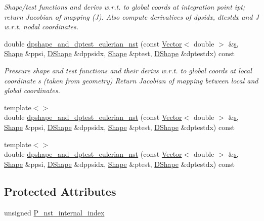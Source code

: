 \begin{DoxyCompactItemize}
\begin{DoxyCompactList}\small\item\em Shape/test functions and derivs w.\+r.\+t. to global coords at integration point ipt; return Jacobian of mapping (J). Also compute derivatives of dpsidx, dtestdx and J w.\+r.\+t. nodal coordinates. \end{DoxyCompactList}\item 
double \hyperlink{classoomph_1_1GeneralisedNewtonianTCrouzeixRaviartElement_a78649bc77d84259e16e565ddd31ff978}{dpshape\+\_\+and\+\_\+dptest\+\_\+eulerian\+\_\+nst} (const \hyperlink{classoomph_1_1Vector}{Vector}$<$ double $>$ \&\hyperlink{cfortran_8h_ab7123126e4885ef647dd9c6e3807a21c}{s}, \hyperlink{classoomph_1_1Shape}{Shape} \&ppsi, \hyperlink{classoomph_1_1DShape}{D\+Shape} \&dppsidx, \hyperlink{classoomph_1_1Shape}{Shape} \&ptest, \hyperlink{classoomph_1_1DShape}{D\+Shape} \&dptestdx) const
\begin{DoxyCompactList}\small\item\em Pressure shape and test functions and their derivs w.\+r.\+t. to global coords at local coordinate s (taken from geometry) Return Jacobian of mapping between local and global coordinates. \end{DoxyCompactList}\item 
{\footnotesize template$<$$>$ }\\double \hyperlink{classoomph_1_1GeneralisedNewtonianTCrouzeixRaviartElement_a8e7f3bf308bd4837cb0326706211de65}{dpshape\+\_\+and\+\_\+dptest\+\_\+eulerian\+\_\+nst} (const \hyperlink{classoomph_1_1Vector}{Vector}$<$ double $>$ \&\hyperlink{cfortran_8h_ab7123126e4885ef647dd9c6e3807a21c}{s}, \hyperlink{classoomph_1_1Shape}{Shape} \&ppsi, \hyperlink{classoomph_1_1DShape}{D\+Shape} \&dppsidx, \hyperlink{classoomph_1_1Shape}{Shape} \&ptest, \hyperlink{classoomph_1_1DShape}{D\+Shape} \&dptestdx) const
\item 
{\footnotesize template$<$$>$ }\\double \hyperlink{classoomph_1_1GeneralisedNewtonianTCrouzeixRaviartElement_a7fd98c3eaa4034ea2f513cceb0c5c096}{dpshape\+\_\+and\+\_\+dptest\+\_\+eulerian\+\_\+nst} (const \hyperlink{classoomph_1_1Vector}{Vector}$<$ double $>$ \&\hyperlink{cfortran_8h_ab7123126e4885ef647dd9c6e3807a21c}{s}, \hyperlink{classoomph_1_1Shape}{Shape} \&ppsi, \hyperlink{classoomph_1_1DShape}{D\+Shape} \&dppsidx, \hyperlink{classoomph_1_1Shape}{Shape} \&ptest, \hyperlink{classoomph_1_1DShape}{D\+Shape} \&dptestdx) const
\end{DoxyCompactItemize}
\subsection*{Protected Attributes}
\begin{DoxyCompactItemize}
\item 
unsigned \hyperlink{classoomph_1_1GeneralisedNewtonianTCrouzeixRaviartElement_ac37e19a65b07207a2ee8e1a5c1166369}{P\+\_\+nst\+\_\+internal\+\_\+index}
\end{DoxyCompactItemize}
